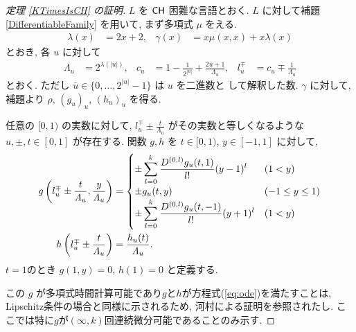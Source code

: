\begin{proof}[\rm 定理 \ref{KTimesIsCH} の証明]
 $L$ を $\mathsf{CH}$ 困難な言語とおく.
 $L$ に対して補題 \ref{DifferentiableFamily} を用いて,
 まず多項式 $\mu$ をえる.
 \begin{align}
  \lambda(x) &= 2x + 2,&
  \gamma(x) &= x \mu(x, x) + x \lambda(x)
 \end{align}
 とおき, 各 $u$ に対して 
\begin{align}
 \Lambda_u 
 &= 2^{\lambda(|u|)}, &
 c_u 
 &= 1-\frac{1}{2^{|u|}}+\frac{2\bar{u}+1}{\Lambda_u}, &
 l_u^\mp 
 &= c_u\mp\frac{1}{\Lambda_u} 
\end{align}  
 とおく. ただし $\bar u \in \{0, \dots, 2^{|u|} - 1\}$ は $u$ を二進数と
 して解釈した数.
 $\gamma$ に対して, 補題より $\rho$, $(g_u)_u$, $(h_u)_u$ を得る.


 任意の $[0,1)$ の実数に対して,
 $l^\mp_u \pm \frac{t}{\Lambda_u}$ がその実数と等しくなるような
 $u, \pm, t\in [0,1]$ が存在する.
 関数 $g, h$ を $t \in [0,1)$, $y \in [-1, 1]$ に対して,
 \begin{align}
 g \left(l^\mp_u \pm \frac{t}{\varLambda_u}, \frac{y}{\varLambda_u}\right)
  &= \begin{cases}
      \pm \displaystyle \sum_{l=0}^k \frac{D^{(0,l)}g_u(t,1)}{l!} (y-1)^l 
      &  (1<y) \\
      \pm g_u(t, y)      & (-1 \le y \le 1) \\
      \pm \displaystyle \sum_{l=0}^k \frac{D^{(0,l)}g_u(t,-1)}{l!} (y+1)^l  
      &  (1<y) \\
    \end{cases} 
  \\
 h \left( l^\mp_u \pm \frac{t}{\varLambda_u} \right) 
  & = \frac{h_u(t)}{\varLambda_u}.
\end{align}
 $t=1$のとき $g(1,y) = 0$, $h(1) = 0$ と定義する.

 この $g$ が多項式時間計算可能であり$g$と$h$が方程式(\ref{eq:ode})を満たすことは,
 Lipschitz条件の場合と同様に示されるため,
 河村による証明を参照されたし\cite[定理3.2]{kawamura2010lipschitz}.
 ここでは特に$g$が$(\infty, k)$回連続微分可能であることのみ示す.


\end{proof}
